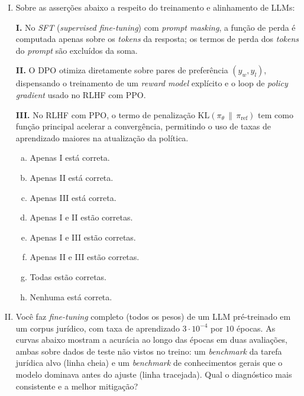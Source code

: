 \documentclass{dlproblemset}
\begin{document}
\begin{enumerate}[I)]
\item Sobre as asserções abaixo a respeito do treinamento e alinhamento de LLMs:

\textbf{I.} No \textit{SFT} (\textit{supervised fine-tuning}) com \textit{prompt masking}, a função de perda é computada apenas sobre os \textit{tokens} da resposta; os termos de perda dos \textit{tokens} do \textit{prompt} são excluídos da soma.

\textbf{II.} O DPO otimiza diretamente sobre pares de preferência $(y_w, y_l)$, dispensando o treinamento de um \textit{reward model} explícito e o loop de \textit{policy gradient} usado no RLHF com PPO.

\textbf{III.} No RLHF com PPO, o termo de penalização $\mathrm{KL}(\pi_\theta \,\|\, \pi_{\text{ref}})$ tem como função principal acelerar a convergência, permitindo o uso de taxas de aprendizado maiores na atualização da política.

\begin{enumerate}[a)]
    \item Apenas I está correta.
    \item Apenas II está correta.
    \item Apenas III está correta.
    \item Apenas I e II estão corretas.
    \item Apenas I e III estão corretas.
    \item Apenas II e III estão corretas.
    \item Todas estão corretas.
    \item Nenhuma está correta.
\end{enumerate}

\item Você faz \textit{fine-tuning} completo (todos os pesos) de um LLM pré-treinado em um corpus jurídico, com taxa de aprendizado $3 \cdot 10^{-4}$ por $10$ épocas. As curvas abaixo mostram a acurácia ao longo das épocas em duas avaliações, ambas sobre dados de teste não vistos no treino: um \textit{benchmark} da tarefa jurídica alvo (linha cheia) e um \textit{benchmark} de conhecimentos gerais que o modelo dominava antes do ajuste (linha tracejada). Qual o diagnóstico mais consistente e a melhor mitigação?


\end{enumerate}
\end{document}

